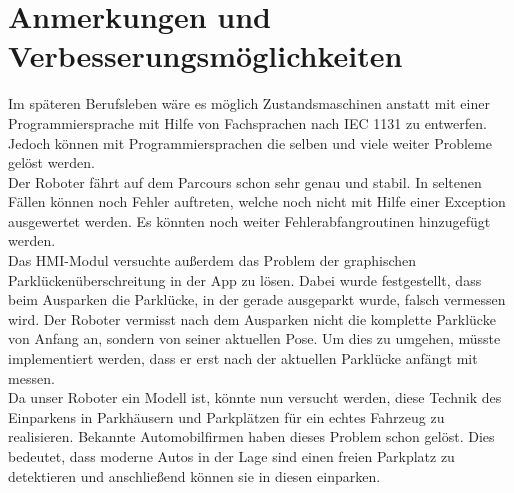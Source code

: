 \chapter{Anmerkungen und Verbesserungsmöglichkeiten}

Im späteren Berufsleben wäre es möglich Zustandsmaschinen anstatt mit einer Programmiersprache mit Hilfe von Fachsprachen nach IEC 1131 zu entwerfen. Jedoch können mit Programmiersprachen die selben und viele weiter Probleme gelöst werden.\\

\noindent Der Roboter fährt auf dem Parcours schon sehr genau und stabil. In seltenen Fällen können noch Fehler auftreten, welche noch nicht mit Hilfe einer Exception ausgewertet werden. Es könnten noch weiter Fehlerabfangroutinen hinzugefügt werden. \\

\noindent Das HMI-Modul versuchte außerdem das Problem der graphischen Parklückenüberschreitung in der App zu lösen. Dabei wurde festgestellt, dass beim Ausparken die Parklücke, in der gerade ausgeparkt wurde, falsch vermessen wird. Der Roboter vermisst nach dem Ausparken nicht die komplette Parklücke von Anfang an, sondern von seiner aktuellen Pose. Um dies zu umgehen, müsste implementiert werden, dass er erst nach der aktuellen Parklücke anfängt mit messen.\\

\noindent Da unser Roboter ein Modell ist, könnte nun versucht werden, diese Technik des Einparkens in Parkhäusern und Parkplätzen für ein echtes Fahrzeug zu realisieren. Bekannte Automobilfirmen haben dieses Problem schon gelöst. Dies bedeutet, dass moderne Autos in der Lage sind einen freien Parkplatz zu detektieren und anschließend können sie in diesen einparken. \\